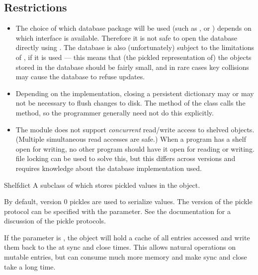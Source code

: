 \subsection{Restrictions}

\begin{itemize}

\item
The choice of which database package will be used
(such as ,  or ) depends on
which interface is available.  Therefore it is not safe to open the database
directly using .  The database is also (unfortunately) subject
to the limitations of , if it is used --- this means
that (the pickled representation of) the objects stored in the
database should be fairly small, and in rare cases key collisions may
cause the database to refuse updates.

\item
Depending on the implementation, closing a persistent dictionary may
or may not be necessary to flush changes to disk.  The 
method of the  class calls the  method, so the
programmer generally need not do this explicitly.

\item
The  module does not support \emph{concurrent} read/write
access to shelved objects.  (Multiple simultaneous read accesses are
safe.)  When a program has a shelf open for writing, no other program
should have it open for reading or writing.  \UNIX{} file locking can
be used to solve this, but this differs across \UNIX{} versions and
requires knowledge about the database implementation used.

\end{itemize}

\begin{classdesc}{Shelf}{dict}
A subclass of  which stores pickled values in the
 object.  

By default, version 0 pickles are used to serialize values.  The
version of the pickle protocol can be specified with the
 parameter. See the  documentation for a
discussion of the pickle protocols. 

If the  parameter is , the object will hold a
cache of all entries accessed and write them back to the  at
sync and close times.  This allows natural operations on mutable entries,
but can consume much more memory and make sync and close take a long time.
\end{classdesc}

